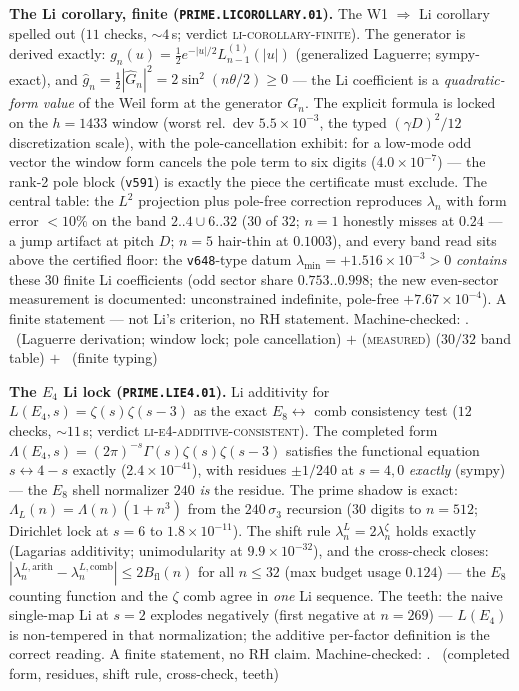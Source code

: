 \documentclass[11pt,a4paper]{article}
\theoremstyle{definition}
\begin{document}
\par\smallskip\noindent\textbf{The Li corollary, finite
(\texttt{PRIME.LICOROLLARY.01}).}
The W1 $\Rightarrow$ Li corollary spelled out ($11$ checks,
${\sim}4$\,s; verdict \textsc{li-corollary-finite}).  The generator
is derived exactly:
$g_n(u)=\tfrac12e^{-|u|/2}L^{(1)}_{n-1}(|u|)$ (generalized Laguerre;
sympy-exact), and
$\hat g_n=\tfrac12|\hat G_n|^2=2\sin^2(n\theta/2)\ge0$ --- the Li
coefficient is a \emph{quadratic-form value} of the Weil form at the
generator $G_n$.  The explicit formula is locked on the $h=1433$
window (worst rel.\ dev $5.5\times10^{-3}$, the typed
$(\gamma D)^2/12$ discretization scale), with the pole-cancellation
exhibit: for a low-mode odd vector the window form cancels the pole
term to six digits ($4.0\times10^{-7}$) --- the rank-2 pole block
(\texttt{v591}) is exactly the piece the certificate must exclude.
The central table: the $L^2$ projection plus pole-free correction
reproduces $\lambda_n$ with form error $<10\%$ on the band
$2..4\cup6..32$ ($30$ of $32$; $n=1$ honestly misses at $0.24$ ---
a jump artifact at pitch $D$; $n=5$ hair-thin at $0.1003$), and
every band read sits above the certified floor: the
\texttt{v648}-type datum $\lambda_{\min}=+1.516\times10^{-3}>0$
\emph{contains} these $30$ finite Li coefficients (odd sector share
$0.753..0.998$; the new even-sector measurement is documented:
unconstrained indefinite, pole-free $+7.67\times10^{-4}$).  A finite
statement --- not Li's criterion, no RH statement.
Machine-checked: .
\mE\ (Laguerre derivation; window lock; pole cancellation) $+$
(\textsc{measured}) ($30/32$ band table) $+$ \mC\ (finite typing)
\par\smallskip

\par\smallskip\noindent\textbf{The $E_4$ Li lock
(\texttt{PRIME.LIE4.01}).}
Li additivity for $L(E_4,s)=\zeta(s)\zeta(s-3)$ as the exact
$E_8\leftrightarrow$ comb consistency test ($12$ checks,
${\sim}11$\,s; verdict \textsc{li-e4-additive-consistent}).  The
completed form
$\Lambda(E_4,s)=(2\pi)^{-s}\Gamma(s)\zeta(s)\zeta(s-3)$ satisfies
the functional equation $s\leftrightarrow4-s$ exactly
($2.4\times10^{-41}$), with residues $\pm1/240$ at $s=4,0$
\emph{exactly} (sympy) --- the $E_8$ shell normalizer $240$
\emph{is} the residue.  The prime shadow is exact:
$\Lambda_L(n)=\Lambda(n)(1+n^3)$ from the $240\,\sigma_3$ recursion
($30$ digits to $n=512$; Dirichlet lock at $s=6$ to
$1.8\times10^{-11}$).  The shift rule
$\lambda_n^L=2\lambda_n^\zeta$ holds exactly (Lagarias additivity;
unimodularity at $9.9\times10^{-32}$), and the cross-check closes:
$|\lambda_n^{L,\mathrm{arith}}-\lambda_n^{L,\mathrm{comb}}|
\le2B_{\mathrm{fl}}(n)$ for all $n\le32$ (max budget usage $0.124$)
--- the $E_8$ counting function and the $\zeta$ comb agree in
\emph{one} Li sequence.  The teeth: the naive single-map Li at $s=2$
explodes negatively (first negative at $n=269$) --- $L(E_4)$ is
non-tempered in that normalization; the additive per-factor
definition is the correct reading.  A finite statement, no RH claim.
Machine-checked: .
\mE\ (completed form, residues, shift rule, cross-check, teeth)
\par\smallskip
\end{document}

